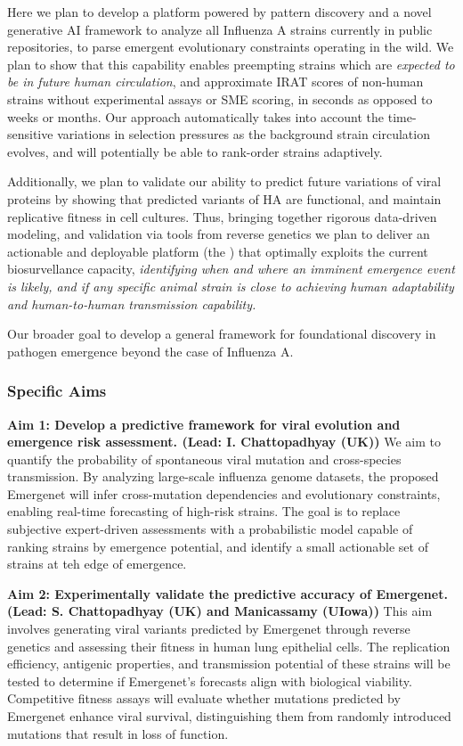 \documentclass[onecolumn, compsoc,11pt]{IEEEtran}
\def\infl{Influenza A\xspace}
\begin{document}
Here we plan to develop a platform powered by  pattern discovery and a novel generative AI framework to analyze all \infl strains currently in public repositories,  to  parse  emergent evolutionary constraints operating  in the wild. We plan to show   that this capability enables preempting  strains which are \textit{expected to be in future human circulation}, and  approximate IRAT scores of non-human strains without  experimental assays or SME scoring, in seconds as opposed to weeks or months. Our approach automatically takes into account the time-sensitive variations in selection pressures as the background strain circulation evolves, and will potentially be able to rank-order strains adaptively.

Additionally, we plan to validate our ability to predict future variations of viral proteins by showing that predicted variants of HA are functional, and maintain replicative fitness in cell cultures.   Thus, bringing together rigorous data-driven modeling, and validation via tools from reverse genetics we plan to deliver an actionable and deployable platform (the \bnd) that optimally exploits the current biosurvellance capacity,  \textit{identifying when and where an imminent  emergence event is likely, and if any specific animal strain is close to achieving human adaptability and  human-to-human transmission capability.}

Our broader goal to develop a general framework for foundational discovery in  pathogen emergence beyond the case of \infl.

  \subsubsection*{Specific Aims}

\textbf{Aim 1: Develop a predictive framework for viral evolution and emergence risk assessment. (Lead: I. Chattopadhyay (UK))}  
We aim to quantify the probability of spontaneous viral mutation and cross-species transmission. By analyzing large-scale influenza genome datasets, the proposed Emergenet will infer cross-mutation dependencies and evolutionary constraints, enabling real-time forecasting of high-risk strains. The goal is to replace subjective expert-driven assessments with a probabilistic model capable of ranking strains by emergence potential, and identify a small actionable set of strains at teh edge of emergence.

\textbf{Aim 2: Experimentally validate the predictive accuracy of Emergenet. (Lead: S. Chattopadhyay (UK) and Manicassamy (UIowa)) }  
This aim involves generating viral variants predicted by Emergenet through reverse genetics and assessing their fitness in human lung epithelial cells. The replication efficiency, antigenic properties, and transmission potential of these strains will be tested to determine if Emergenet's forecasts align with biological viability. Competitive fitness assays will evaluate whether mutations predicted by Emergenet enhance viral survival, distinguishing them from randomly introduced mutations that result in loss of function.
\end{document}
